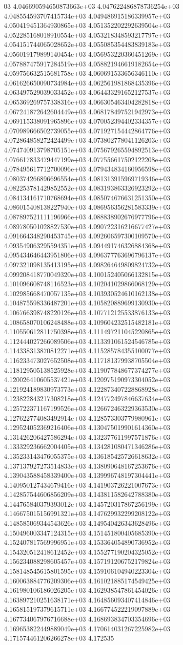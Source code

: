 03	4.046690594650873663e+03	4.047622486878736254e+03	4.048554593707415734e+03	4.049486915186339957e+03	4.050419451364930865e+03	4.051352202292639504e+03	4.052285168018910554e+03	4.053218348593217797e+03	4.054151744065028652e+03	4.055085354483839183e+03	4.056019179899140454e+03	4.056953220360451269e+03	4.057887475917284519e+03	4.058821946619182654e+03	4.059756632515681758e+03	4.060691533656346110e+03	4.061626650090734984e+03	4.062561981868435396e+03	4.063497529039033452e+03	4.064433291652127537e+03	4.065369269757338316e+03	4.066305463404282818e+03	4.067241872642604449e+03	4.068178497521942973e+03	4.069115338091965896e+03	4.070052394402334357e+03	4.070989666502739055e+03	4.071927154442864776e+03	4.072864858272424499e+03	4.073802778041126203e+03	4.074740913798705151e+03	4.075679265594892513e+03	4.076617833479447199e+03	4.077556617502122208e+03	4.078495617712700096e+03	4.079434834160956598e+03	4.080374266896696554e+03	4.081313915969719346e+03	4.082253781429852552e+03	4.083193863326923292e+03	4.084134161710768694e+03	4.085074676631251350e+03	4.086015408138227940e+03	4.086956356281583339e+03	4.087897521111196966e+03	4.088838902676977796e+03	4.089780501028827530e+03	4.090722316216677427e+03	4.091664348290453745e+03	4.092606597300109570e+03	4.093549063295594351e+03	4.094491746326884368e+03	4.095434646443951806e+03	4.096377763696796137e+03	4.097321098135413195e+03	4.098264649809824732e+03	4.099208418770049320e+03	4.100152405066132815e+03	4.101096608748116523e+03	4.102041029866068129e+03	4.102985668470057135e+03	4.103930524610162138e+03	4.104875598336487201e+03	4.105820889699130930e+03	4.106766398748220126e+03	4.107712125533876133e+03	4.108658070106248488e+03	4.109604232515482181e+03	4.110550612811750398e+03	4.111497211045220865e+03	4.112444027266089506e+03	4.113391061524546785e+03	4.114338313870812271e+03	4.115285784355100077e+03	4.116233473027652508e+03	4.117181379938705504e+03	4.118129505138525928e+03	4.119077848677374277e+03	4.120026410605537421e+03	4.120975190973304052e+03	4.121924189830973773e+03	4.122873407228868928e+03	4.123822843217308218e+03	4.124772497846637634e+03	4.125722371167199526e+03	4.126672463229363530e+03	4.127622774083492914e+03	4.128573303779980961e+03	4.129524052369216406e+03	4.130475019901614360e+03	4.131426206427586294e+03	4.132377611997571876e+03	4.133329236662004405e+03	4.134281080471346286e+03	4.135233143476055375e+03	4.136185425726618632e+03	4.137137927273514833e+03	4.138090648167253676e+03	4.139043588458339400e+03	4.139996748197304441e+03	4.140950127434679416e+03	4.141903726221007673e+03	4.142857544606856209e+03	4.143811582642788380e+03	4.144765840379393012e+03	4.145720317867256199e+03	4.146675015156991321e+03	4.147629932299208122e+03	4.148585069344543626e+03	4.149540426343628496e+03	4.150496003347124315e+03	4.151451800405685390e+03	4.152407817569996951e+03	4.153364054890736952e+03	4.154320512418612452e+03	4.155277190204325052e+03	4.156234088298605457e+03	4.157191206752179824e+03	4.158148545615801595e+03	4.159106104940223304e+03	4.160063884776209306e+03	4.161021885174549425e+03	4.161980106186026205e+03	4.162938547861454026e+03	4.163897210251638171e+03	4.164856093407414846e+03	4.165815197379615711e+03	4.166774522219097889e+03	4.167734067976716688e+03	4.168693834703354696e+03	4.169653822449889049e+03	4.170614031267225982e+03	4.171574461206266278e+03	4.172535